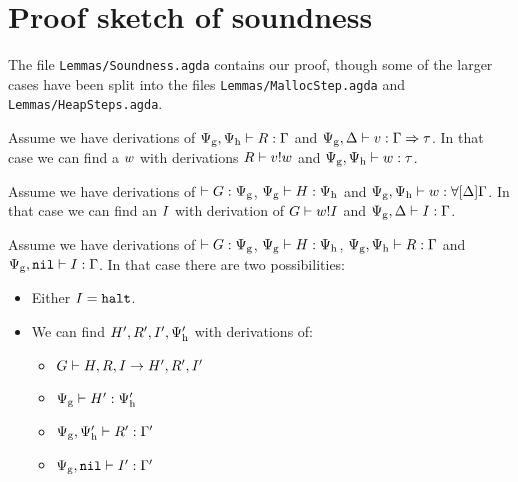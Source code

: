 \appendix
\chapter{Proof sketch of soundness}
\label{sec:soundness-proof}

The file \texttt{Lemmas/Soundness.agda} contains our proof, though some of the
larger cases have been split into the files \texttt{Lemmas/MallocStep.agda} and
\texttt{Lemmas/HeapSteps.agda}.


\begin{lemma}
  Assume we have derivations of
  ${\Psi_{\mathrm{g}},\Psi_{\mathrm{h}}} |- {R} : {\Gamma}$ and
  ${\Psi_{\mathrm{g}},\Delta} |- {v} : {\Gamma => \tau}$. In that case we
  can find a $w$ with derivations ${R} |- {v} ! {w}$
  and ${\Psi_{\mathrm{g}},\Psi_{\mathrm{h}}} |- {w} : {\tau}$.
\end{lemma}

\begin{lemma}
  Assume we have derivations of $|- {G} : {\Psi_{\mathrm{g}}}$,
  ${\Psi_{\mathrm{g}}} |- {H} : {\Psi_{\mathrm{h}}}$ and
  ${\Psi_{\mathrm{g}},\Psi_{\mathrm{h}}} |- {w} : {\forall[ \Delta ]
    \Gamma}$. In that case we can find an $I$ with derivation of
  ${G} |- {w} ! {I}$ and
  ${\Psi_{\mathrm{g}}, \Delta} |- {I} : {\Gamma}$.
\end{lemma}

\begin{lemma}
  Assume we have derivations of $|- {G} : {\Psi_{\mathrm{g}}}$,
  ${\Psi_{\mathrm{g}}} |- {H} : {\Psi_{\mathrm{h}}}$,
  ${\Psi_{\mathrm{g}},\Psi_{\mathrm{h}}} |- {R} : {\Gamma}$ and
  ${\Psi_{\mathrm{g}}, \mathtt{nil}} |- {I} : {\Gamma}$. In that case
  there are two possibilities:
  \begin{itemize}
  \item Either $I = \mathtt{halt}$.
  \item We can find $H', R', I', \Psi_{\mathrm{h}}'$ with
    derivations of:
    \begin{itemize}
    \item ${G} |- {H, R, I} -> {H', R', I'}$
    \item ${\Psi_{\mathrm{g}}} |- {H'} : {\Psi_{\mathrm{h}}'}$
    \item ${\Psi_{\mathrm{g}},\Psi_{\mathrm{h}}'} |- {R'} : {\Gamma'}$
    \item ${\Psi_{\mathrm{g}}, \mathtt{nil}} |- {I'} : {\Gamma'}$
    \end{itemize}
  \end{itemize}
\end{lemma}

